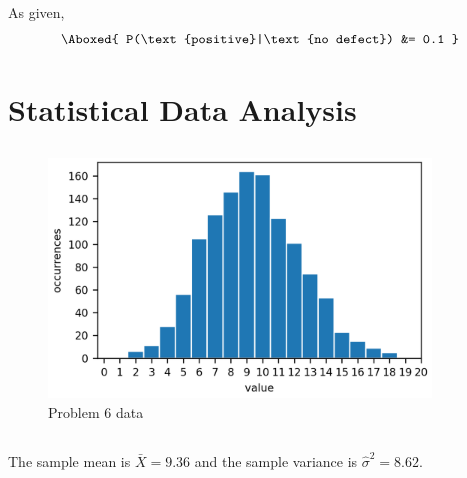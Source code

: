 \documentclass[11pt]{article}
\begin{document}
\subsection{}  %
As given,
\begin{align*}
    \Aboxed{
        P(\text{positive}|\text{no defect}) &= 0.1
    }
\end{align*}

\section{Statistical Data Analysis}

\subsection{}  %

\begin{figure}[H]
    \centering
    \includegraphics[width=4in]{6afig1.png}
    \caption{Problem 6 data}
    \label{6afig1}
\end{figure}

\subsection{}  %
\begin{mdframed}
    The sample mean is $\bar{X}=9.36$ and the sample variance is $\hat{\sigma}^2=8.62$.
\end{mdframed}
\end{document}
